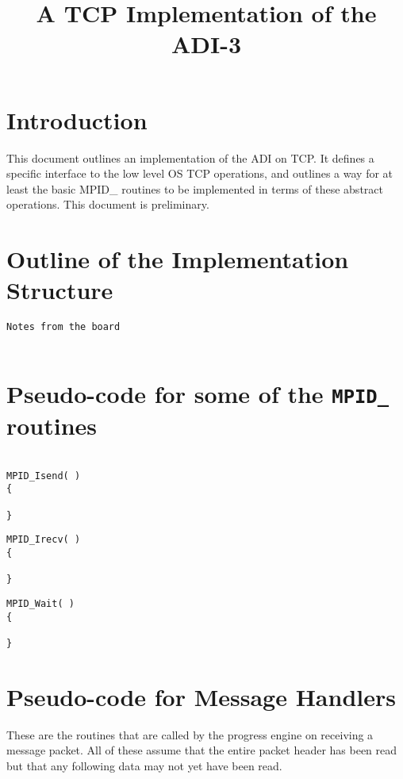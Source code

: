 \documentclass{article}
\def\code#1{\texttt{#1}}
\begin{document}
\title{A TCP Implementation of the ADI-3}
\author{}
\maketitle

\begin{abstract}

\end{abstract}

\section{Introduction}
This document outlines an implementation of the ADI on TCP.  It defines a
specific interface to the low level OS TCP operations, and outlines a way
for at least the basic MPID_ routines to be implemented in terms of these
abstract operations.  This document is preliminary.

\section{Outline of the Implementation Structure}

\begin{verbatim}
Notes from the board


\end{verbatim}

\section{Pseudo-code for some of the \code{MPID_} routines}

\begin{verbatim}

MPID_Isend( )
{

}
\end{verbatim}

\begin{verbatim}
MPID_Irecv( )
{

}
\end{verbatim}

\begin{verbatim}
MPID_Wait( )
{

}
\end{verbatim}

\section{Pseudo-code for Message Handlers}
These are the routines that are called by the progress engine on receiving a
message packet.  All of these assume that the entire packet header has been 
read but that any following data may not yet have been read.
\end{document}
